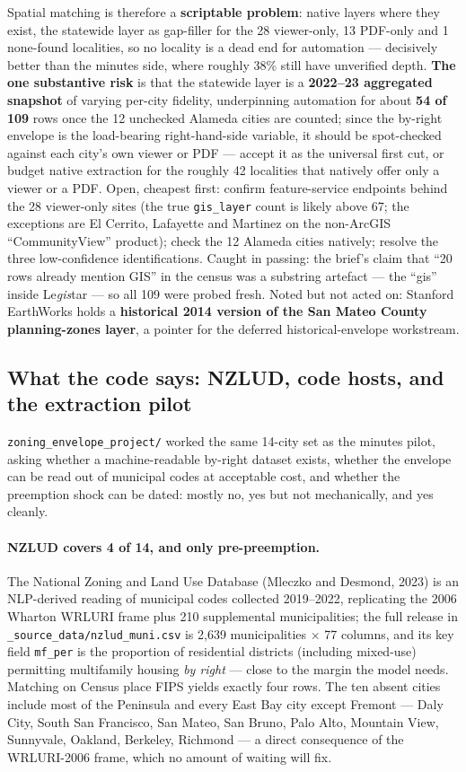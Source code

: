 \documentclass[11pt]{article}
\begin{document}
Spatial matching is therefore a \textbf{scriptable problem}: native layers where they exist, the
statewide layer as gap-filler for the 28 viewer-only, 13 PDF-only and 1 none-found localities, so
no locality is a dead end for automation --- decisively better than the minutes side, where
roughly 38\% still have unverified depth. \textbf{The one substantive risk} is that
the statewide layer is a \textbf{2022--23 aggregated snapshot} of varying per-city fidelity,
underpinning automation for about \textbf{54 of 109} rows once the 12 unchecked Alameda cities
are counted; since the by-right envelope is the load-bearing right-hand-side variable, it should
be spot-checked against each city's own viewer or PDF --- accept it as the universal first cut,
or budget native extraction for the roughly 42 localities that natively offer only a viewer or a
PDF. Open, cheapest first: confirm feature-service endpoints behind the 28 viewer-only sites (the
true \texttt{gis\_layer} count is likely above 67; the exceptions are El Cerrito, Lafayette and
Martinez on the non-ArcGIS ``CommunityView'' product); check the 12 Alameda cities natively;
resolve the three low-confidence identifications. Caught in passing: the brief's claim that ``20
rows already mention GIS'' in the census was a substring artefact --- the ``gis'' inside
Le\emph{gis}tar --- so all 109 were probed fresh. Noted but not acted on: Stanford EarthWorks
holds a \textbf{historical 2014 version of the San Mateo County planning-zones layer}, a pointer
for the deferred historical-envelope workstream.

\subsection{What the code says: NZLUD, code hosts, and the extraction pilot}

\texttt{zoning\_envelope\_project/} worked the same 14-city set as the minutes pilot, asking
whether a machine-readable by-right dataset exists, whether the envelope can be read out of
municipal codes at acceptable cost, and whether the preemption shock can be dated: mostly no, yes
but not mechanically, and yes cleanly.

\paragraph{NZLUD covers 4 of 14, and only pre-preemption.} The National Zoning and Land Use
Database (Mleczko and Desmond, 2023) is an NLP-derived reading of municipal codes collected
2019--2022, replicating the 2006 Wharton WRLURI frame plus 210 supplemental municipalities; the
full release in \texttt{\_source\_data/nzlud\_muni.csv} is 2,639 municipalities $\times$ 77
columns, and its key field \texttt{mf\_per} is the proportion of residential districts (including
mixed-use) permitting multifamily housing \emph{by right} --- close to the margin the model
needs. Matching on Census place FIPS yields exactly four rows. The ten absent cities include most
of the Peninsula and every East Bay city except Fremont --- Daly City, South San Francisco, San
Mateo, San Bruno, Palo Alto, Mountain View, Sunnyvale, Oakland, Berkeley, Richmond --- a direct
consequence of the WRLURI-2006 frame, which no amount of waiting will fix.
\end{document}
